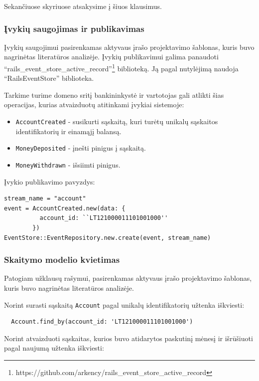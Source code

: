 Sekančiuose skyriuose atsakysime į šiuos klausimus.

\subsubsection{Įvykių saugojimas ir publikavimas}

Įvykių saugojimui pasirenkamas aktyvaus įrašo projektavimo šablonas, kuris buvo nagrinėtas literatūros analizėje. Įvykių publikavimui galima panaudoti ``rails\_event\_store\_active\_record''\footnote{https://github.com/arkency/rails\_event\_store\_active\_record} biblioteką. Ją pagal nutylėjimą naudoja ``RailsEventStore'' biblioteka.

Tarkime turime domeno sritį bankininkystė ir vartotojas gali atlikti šias operacijas, kurias atvaizduotų atitinkami įvykiai sistemoje:

\begin{itemize}
  \item \lstinline|AccountCreated| - susikurti sąskaitą, kuri turėtų unikalų sąskaitos identifikatorių ir einamąjį balansą.
  \item \lstinline|MoneyDeposited| - įnešti pinigus į sąskaitą.
  \item \lstinline|MoneyWithdrawn| - išsiimti pinigus.
\end{itemize}

Įvykio publikavimo pavyzdys:

\begin{lstlisting}
stream_name = "account"
event = AccountCreated.new(data: {
          account_id: ``LT121000011101001000''
        })
EventStore::EventRepository.new.create(event, stream_name)
\end{lstlisting}

\subsubsection{Skaitymo modelio kvietimas}

Patogiam užklausų rašymui, pasirenkamas aktyvaus įrašo projektavimo šablonas, kuris buvo nagrinėtas literatūros analizėje.

Norint surasti sąskaitą \lstinline|Account| pagal unikalų identifikatorių užtenka iškviesti:

\begin{lstlisting}
  Account.find_by(account_id: 'LT121000011101001000')
\end{lstlisting}

Norint atvaizduoti sąskaitas, kurios buvo atidarytos paskutinį mėnesį ir išrūšiuoti pagal naujumą užtenka iškviesti:

